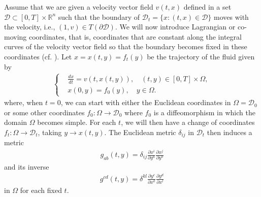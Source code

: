 \documentclass[12pt,reqno]{amsart}
\numberwithin{equation}{section}
\theoremstyle{definition}
\theoremstyle{remark}
\begin{document}
Assume that we are given a velocity vector field ${v}(t,x)$ defined in a set ${{\mathscr{D}}}\subset [0,T]\times{\mathbb R}^n$ such that the boundary of ${{\mathscr{D}_t}}=\{x: (t,x)\in{{\mathscr{D}}}\}$ moves with the velocity, i.e., $(1,{v})\in T({\partial}{{\mathscr{D}}})$. We will now introduce Lagrangian or co-moving coordinates, that is, coordinates that are constant along the integral curves of the velocity vector field so that the boundary becomes fixed in these coordinates (cf. \cite{CL00}). Let $x=x(t,y)=f_t(y)$ be the trajectory of the fluid given by
\begin{align}\label{trajectory}
  \left\{\begin{aligned}
    &\frac{dx}{dt}={v}(t,x(t,y)), \quad (t,y)\in [0,T]\times \Omega,\\
    &x(0,y)=f_0(y), \quad y\in\Omega.
  \end{aligned}\right.
\end{align}
where, when $t=0$, we can start with either the Euclidean coordinates in $\Omega={{\mathscr{D}}}_0$ or some other coordinates $f_0:\Omega\to {{\mathscr{D}}}_0$ where $f_0$ is a diffeomorphism in which the domain $\Omega$ becomes simple. For each $t$, we will then have a change of coordinates $f_t:\Omega\to {{\mathscr{D}_t}}$, taking $y\to x(t,y)$.  The Euclidean metric $\delta_{ij}$ in ${{\mathscr{D}_t}}$ then induces a metric
\begin{align}\label{metric1}
  g_{ab}(t,y)=\delta_{ij}\frac{{\partial} x^i}{{\partial} y^a}\frac{{\partial} x^j}{{\partial} y^b}
\end{align}
and its inverse
\begin{align}
  g^{cd}(t,y)=\delta^{kl}\frac{{\partial} y^c}{{\partial} x^k}\frac{{\partial} y^d}{{\partial} x^l}
\end{align}
in $\Omega$ for each fixed $t$.
\end{document}
